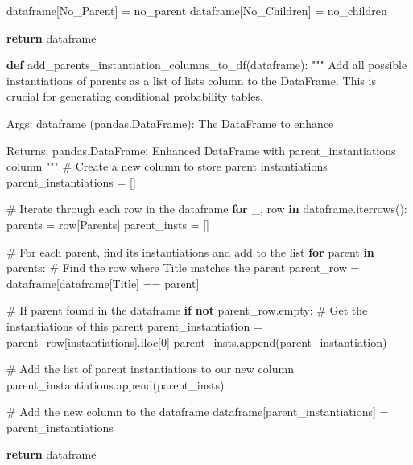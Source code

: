 \documentclass[
  11pt,
  letterpaper,
]{book}
\newenvironment{Shaded}{\begin{snugshade}}{\end{snugshade}}
\newcommand{\CommentTok}[1]{\textcolor[rgb]{0.37,0.37,0.37}{#1}}
\newcommand{\ControlFlowTok}[1]{\textcolor[rgb]{0.00,0.23,0.31}{\textbf{#1}}}
\newcommand{\DecValTok}[1]{\textcolor[rgb]{0.68,0.00,0.00}{#1}}
\newcommand{\KeywordTok}[1]{\textcolor[rgb]{0.00,0.23,0.31}{\textbf{#1}}}
\newcommand{\NormalTok}[1]{\textcolor[rgb]{0.00,0.23,0.31}{#1}}
\newcommand{\OperatorTok}[1]{\textcolor[rgb]{0.37,0.37,0.37}{#1}}
\newcommand{\StringTok}[1]{\textcolor[rgb]{0.13,0.47,0.30}{#1}}
\begin{document}
\begin{Shaded}
\begin{Highlighting}[]
\NormalTok{    dataframe[}\StringTok{\textquotesingle{}No\_Parent\textquotesingle{}}\NormalTok{] }\OperatorTok{=}\NormalTok{ no\_parent}
\NormalTok{    dataframe[}\StringTok{\textquotesingle{}No\_Children\textquotesingle{}}\NormalTok{] }\OperatorTok{=}\NormalTok{ no\_children}

    \ControlFlowTok{return}\NormalTok{ dataframe}

\KeywordTok{def}\NormalTok{ add\_parents\_instantiation\_columns\_to\_df(dataframe):}
    \CommentTok{"""}
\CommentTok{    Add all possible instantiations of parents as a list of lists column}
\CommentTok{    to the DataFrame.}
\CommentTok{    This is crucial for generating conditional probability tables.}

\CommentTok{    Args:}
\CommentTok{        dataframe (pandas.DataFrame): The DataFrame to enhance}

\CommentTok{    Returns:}
\CommentTok{        pandas.DataFrame: Enhanced DataFrame with parent\_instantiations column}
\CommentTok{    """}
    \CommentTok{\# Create a new column to store parent instantiations}
\NormalTok{    parent\_instantiations }\OperatorTok{=}\NormalTok{ []}

    \CommentTok{\# Iterate through each row in the dataframe}
    \ControlFlowTok{for}\NormalTok{ \_, row }\KeywordTok{in}\NormalTok{ dataframe.iterrows():}
\NormalTok{        parents }\OperatorTok{=}\NormalTok{ row[}\StringTok{\textquotesingle{}Parents\textquotesingle{}}\NormalTok{]}
\NormalTok{        parent\_insts }\OperatorTok{=}\NormalTok{ []}

        \CommentTok{\# For each parent, find its instantiations and add to the list}
        \ControlFlowTok{for}\NormalTok{ parent }\KeywordTok{in}\NormalTok{ parents:}
            \CommentTok{\# Find the row where Title matches the parent}
\NormalTok{            parent\_row }\OperatorTok{=}\NormalTok{ dataframe[dataframe[}\StringTok{\textquotesingle{}Title\textquotesingle{}}\NormalTok{] }\OperatorTok{==}\NormalTok{ parent]}

            \CommentTok{\# If parent found in the dataframe}
            \ControlFlowTok{if} \KeywordTok{not}\NormalTok{ parent\_row.empty:}
                \CommentTok{\# Get the instantiations of this parent}
\NormalTok{                parent\_instantiation }\OperatorTok{=}\NormalTok{ parent\_row[}\StringTok{\textquotesingle{}instantiations\textquotesingle{}}\NormalTok{].iloc[}\DecValTok{0}\NormalTok{]}
\NormalTok{                parent\_insts.append(parent\_instantiation)}

        \CommentTok{\# Add the list of parent instantiations to our new column}
\NormalTok{        parent\_instantiations.append(parent\_insts)}

    \CommentTok{\# Add the new column to the dataframe}
\NormalTok{    dataframe[}\StringTok{\textquotesingle{}parent\_instantiations\textquotesingle{}}\NormalTok{] }\OperatorTok{=}\NormalTok{ parent\_instantiations}

    \ControlFlowTok{return}\NormalTok{ dataframe}
\end{Highlighting}
\end{Shaded}
\end{document}
